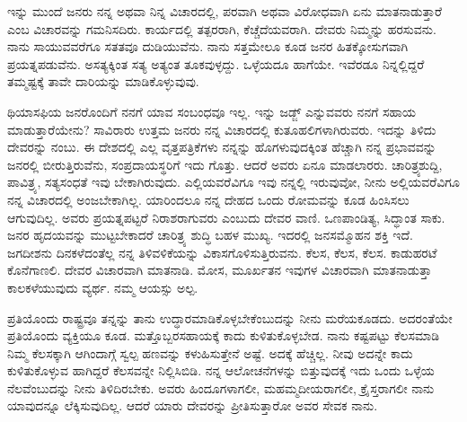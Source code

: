 ಇನ್ನು ಮುಂದೆ ಜನರು ನನ್ನ ಅಥವಾ ನಿನ್ನ ವಿಚಾರದಲ್ಲಿ, ಪರವಾಗಿ ಅಥವಾ ವಿರೋಧವಾಗಿ ಏನು ಮಾತನಾಡುತ್ತಾರೆ ಎಂಬ ವಿಚಾರವನ್ನು ಗಮನಿಸದಿರು. ಕಾರ್ಯದಲ್ಲಿ ತತ್ಪರರಾಗಿ, ಕೆಚ್ಚೆದೆಯವರಾಗಿ. ದೇವರು ನಿಮ್ಮನ್ನು ಹರಸುವನು. ನಾನು ಸಾಯುವವರೆಗೂ ಸತತವೂ ದುಡಿಯುವೆನು. ನಾನು ಸತ್ತಮೇಲೂ ಕೂಡ ಜನರ ಹಿತಕ್ಕೋಸುಗವಾಗಿ ಪ್ರಯತ್ನಪಡುವೆನು. ಅಸತ್ಯಕ್ಕಿಂತ ಸತ್ಯ ಅತ್ಯಂತ ತೂಕವುಳ್ಳದ್ದು. ಒಳ್ಳೆಯದೂ ಹಾಗೆಯೇ. ಇವೆರಡೂ ನಿನ್ನಲ್ಲಿದ್ದರೆ ತಮ್ಮಷ್ಟಕ್ಕೆ ತಾವೇ ದಾರಿಯನ್ನು ಮಾಡಿಕೊಳ್ಳುವುವು.
\vspace{0.4cm}

ಥಿಯಾಸಫಿಯ ಜನರೊಂದಿಗೆ ನನಗೆ ಯಾವ ಸಂಬಂಧವೂ ಇಲ್ಲ. ಇನ್ನು ಜಡ್ಜ್ ಎನ್ನುವವರು ನನಗೆ ಸಹಾಯ ಮಾಡುತ್ತಾರೆಯೇನು? ಸಾವಿರಾರು ಉತ್ತಮ ಜನರು ನನ್ನ ವಿಚಾರದಲ್ಲಿ ಕುತೂಹಲಿಗಳಾಗಿರುವರು. ಇದನ್ನು ತಿಳಿದು ದೇವರನ್ನು ನಂಬು. ಈ ದೇಶದಲ್ಲಿ ಎಲ್ಲ ವೃತ್ತಪತ್ರಿಕೆಗಳು ನನ್ನನ್ನು ಹೊಗಳುವುದಕ್ಕಿಂತ ಹೆಚ್ಚಾಗಿ ನನ್ನ ಪ್ರಭಾವವನ್ನು ಜನರಲ್ಲಿ ಬೀರುತ್ತಿರುವೆನು, ಸಂಪ್ರದಾಯಸ್ಥರಿಗೆ ಇದು ಗೊತ್ತು. ಆದರೆ ಅವರು ಏನೂ ಮಾಡಲಾರರು. ಚಾರಿತ್ರ್ಯಶುದ್ದಿ, ಪಾವಿತ್ರ್ಯ, ಸತ್ಯಸಂಧತೆ ಇವು ಬೇಕಾಗಿರುವುದು. ಎಲ್ಲಿಯವರೆವಿಗೂ ಇವು ನನ್ನಲ್ಲಿ ಇರುವುವೋ, ನೀನು ಅಲ್ಲಿಯವರೆವಿಗೂ ನನ್ನ ವಿಚಾರದಲ್ಲಿ ಅಂಜಬೇಕಾಗಿಲ್ಲ. ಯಾರಿಂದಲೂ ನನ್ನ ದೇಹದ ಒಂದು ರೋಮವನ್ನು ಕೂಡ ಹಿಂಸಿಸಲು ಆಗುವುದಿಲ್ಲ. ಅವರು ಪ್ರಯತ್ನಪಟ್ಟರೆ ನಿರಾಶರಾಗುವರು ಎಂಬುದು ದೇವರ ವಾಣಿ. ಒಣಪಾಂಡಿತ್ಯ, ಸಿದ್ಧಾಂತ ಸಾಕು. ಜನರ ಹೃದಯವನ್ನು ಮುಟ್ಟಬೇಕಾದರೆ ಚಾರಿತ್ರ್ಯ ಶುದ್ಧಿ ಬಹಳ ಮುಖ್ಯ. ಇದರಲ್ಲಿ ಜನಸಮ್ಮೊಹನ ಶಕ್ತಿ ಇದೆ. ಜಗದೀಶನು ದಿನಕಳೆದಂತೆಲ್ಲ ನನ್ನ ತಿಳಿವಳಿಕೆಯನ್ನು ವಿಕಾಸಗೊಳಿಸುತ್ತಿರುವನು. ಕೆಲಸ, ಕೆಲಸ, ಕೆಲಸ. ಕಾಡುಹರಟೆ ಕೊನೆಗಾಣಲಿ. ದೇವರ ವಿಚಾರವಾಗಿ ಮಾತನಾಡಿ. ಮೋಸ, ಮೂರ್ಖತನ ಇವುಗಳ ವಿಚಾರವಾಗಿ ಮಾತನಾಡುತ್ತಾ ಕಾಲಕಳೆಯುವುದು ವ್ಯರ್ಥ. ನಮ್ಮ ಆಯಸ್ಸು ಅಲ್ಪ.

ಪ್ರತಿಯೊಂದು ರಾಷ್ಟ್ರವೂ ತನ್ನನ್ನು ತಾನು ಉದ್ಧಾರಮಾಡಿಕೊಳ್ಳಬೇಕೆಂಬುದನ್ನು ನೀನು ಮರೆಯಕೂಡದು. ಅದರಂತೆಯೇ ಪ್ರತಿಯೊಂದು ವ್ಯಕ್ತಿಯೂ ಕೂಡ. ಮತ್ತೊಬ್ಬರ\break ಸಹಾಯಕ್ಕೆ ಕಾದು ಕುಳಿತುಕೊಳ್ಳಬೇಡ. ನಾನು ಕಷ್ಟಪಟ್ಟು ಕೆಲಸಮಾಡಿ ನಿಮ್ಮ ಕೆಲಸಕ್ಕಾಗಿ ಆಗಿಂದಾಗ್ಗೆ ಸ್ವಲ್ಪ ಹಣವನ್ನು ಕಳುಹಿಸುತ್ತೇನೆ ಅಷ್ಟೆ. ಅದಕ್ಕೆ ಹೆಚ್ಚಿಲ್ಲ. ನೀವು ಅದನ್ನೇ ಕಾದು ಕುಳಿತುಕೊಳ್ಳುವ ಹಾಗಿದ್ದರೆ ಕೆಲಸವನ್ನೇ ನಿಲ್ಲಿಸಿಬಿಡಿ. ನನ್ನ ಆಲೋಚನೆಗಳನ್ನು ಬಿತ್ತುವುದಕ್ಕೆ ಇದು ಒಂದು ಒಳ್ಳೆಯ ನೆಲವೆಂಬುದನ್ನು ನೀನು ತಿಳಿದಿರಬೇಕು. ಅವರು ಹಿಂದೂಗಳಾಗಲೀ, ಮಹಮ್ಮದೀಯರಾಗಲೀ, ಕ್ರೈಸ್ತರಾಗಲೀ ನಾನು ಯಾವುದನ್ನೂ ಲೆಕ್ಕಿಸುವುದಿಲ್ಲ. ಆದರೆ ಯಾರು ದೇವರನ್ನು ಪ್ರೀತಿಸುತ್ತಾರೋ ಅವರ ಸೇವಕ ನಾನು.

